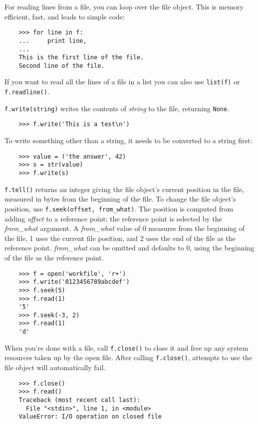 \documentclass[UTF8]{article}
\begin{document}
For reading lines from a file, you can loop over the file object. This is memory efficient, fast,
and leads to simple code:
\begin{verbatim}
    >>> for line in f:
    ...     print line,
    ...
    This is the first line of the file.
    Second line of the file.
\end{verbatim}

If you want to read all the lines of a file in a list you can also use \texttt{list(f)}
or \texttt{f.readline()}.

\texttt{f.write(string)} writes the contents of \emph{string} to the file, returning
\texttt{None}.
\begin{verbatim}
    >>> f.write('This is a test\n')
\end{verbatim}

To write something other than a string, it needs to be converted to a string first:
\begin{verbatim}
    >>> value = ('the answer', 42)
    >>> s = str(value)
    >>> f.write(s)
\end{verbatim}

\texttt{f.tell()} returns an integer giving the file object's current position in the
file, measured in bytes from the beginning of the file. To change the file object's position, use
\texttt{f.seek(offset, from_what)}. The position is computed from adding \emph{offset}
to a reference point; the reference point is selected by the \emph{from\_what} argument. A
\emph{from\_what} value of 0 measures from the beginning of the file, 1 uses the current file
position, and 2 uses the end of the file as the reference point. \emph{from\_what} can be omitted
and defaults to 0, using the beginning of the file as the reference point.
\begin{verbatim}
    >>> f = open('workfile', 'r+')
    >>> f.write('0123456789abcdef')
    >>> f.seek(5)
    >>> f.read(1)
    '5'
    >>> f.seek(-3, 2)
    >>> f.read(1)
    'd'
\end{verbatim}

When you're done with a file, call \texttt{f.close()} to close it and free up any
system resources taken up by the open file. After calling \texttt{f.close()}, attempts
to use the file object will automatically fail.
\begin{verbatim}
    >>> f.close()
    >>> f.read()
    Traceback (most recent call last):
      File "<stdin>", line 1, in <module>
    ValueError: I/O operation on closed file
\end{verbatim}
\end{document}
